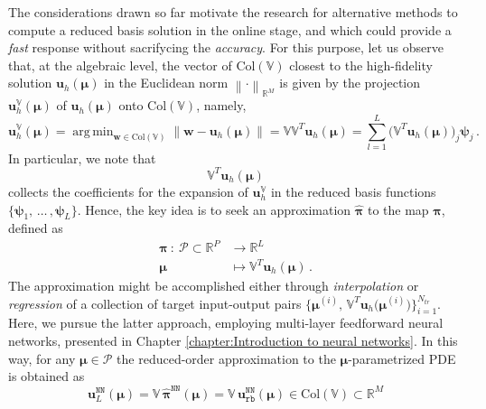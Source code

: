 \documentclass[12pt, a4paper, twoside, openright, notitlepage]{report}
\numberwithin{equation}{chapter}
\theoremstyle{theorem}
\theoremstyle{definition}
\theoremstyle{remark}
\theoremstyle{proposition}
\numberwithin{figure}{chapter}
\DeclareMathOperator*{\argmin}{arg\,min}
\newcommand{\norm}[1]{\left\lVert#1\right\rVert}
\newcommand{\bg}[1]{\boldsymbol{#1}}
\begin{document}
		The considerations drawn so far motivate the research for alternative methods to compute a reduced basis solution in the online stage, and which could provide a \emph{fast} response without sacrifycing the \emph{accuracy}. For this purpose, let us observe that, at the algebraic level, the vector of $\text{Col}(\mathbb{V})$ closest to the high-fidelity solution $\mathbf{u}_h(\bg{\mu})$ in the Euclidean norm $\norm{\cdot}_{\mathbb{R}^M}$ is given by the projection $\mathbf{u}_h^{\mathbb{V}}(\bg{\mu})$ of $\mathbf{u}_h(\bg{\mu})$ onto $\text{Col}(\mathbb{V})$, namely,
		\begin{equation*}
			\mathbf{u}_h^{\mathbb{V}}(\bg{\mu}) = \argmin_{\mathbf{w} \in \text{Col}(\mathbb{V})}{\norm{\mathbf{w} - \mathbf{u}_h(\bg{\mu})}} = \mathbb{V} \mathbb{V}^T \mathbf{u}_h(\bg{\mu}) = \sum_{l = 1}^L \big( \mathbb{V}^T \mathbf{u}_h(\bg{\mu}) \big)_j \bg{\psi}_j \, .
		\end{equation*}
		In particular, we note that
		\begin{equation*}
			\mathbb{V}^T \mathbf{u}_h(\bg{\mu})
		\end{equation*}
		collects the coefficients for the expansion of $\mathbf{u}_h^{\mathbb{V}}$ in the reduced basis functions $\big\lbrace \bg{\psi}_1, \, \ldots \, , \bg{\psi}_L \big\rbrace$. Hence, the key idea is to seek an approximation $\hat{\boldsymbol{\pi}}$ to the map $\boldsymbol{\pi}$, defined as
		\begin{equation*}
			\label{eq:interpolation-function}
			\begin{aligned}
				\boldsymbol{\pi} ~ : ~ \mathcal{P} \subset \mathbb{R}^P & \rightarrow \mathbb{R}^L \\
				\boldsymbol{\mu} ~ & \mapsto \mathbb{V}^T \mathbf{u}_h(\boldsymbol{\mu}) \, .
			\end{aligned}
		\end{equation*} 
		The approximation might be accomplished either through \emph{interpolation} \cite{Ams10, Chen17} or \emph{regression} \cite{Haa13} of a collection of target input-output pairs $\big\lbrace \boldsymbol{\mu}^{(i)}, \, \mathbb{V}^T \mathbf{u}_h \big( \boldsymbol{\mu}^{(i)}\big) \big\rbrace_{i = 1}^{N_{tr}}$. Here, we pursue the latter approach, employing multi-layer feedforward neural networks, presented in Chapter \ref{chapter:Introduction to neural networks}. In this way, for any $\bg{\mu} \in \mathcal{P}$ the reduced-order approximation to the $\bg{\mu}$-parametrized PDE is obtained as
		\begin{equation*}
			\mathbf{u}_L^{\texttt{NN}}(\bg{\mu}) = \mathbb{V} \, \hat{\bg{\pi}}^{\texttt{NN}}(\bg{\mu}) = \mathbb{V} \, \mathbf{u}_{\texttt{rb}}^{\texttt{NN}}(\bg{\mu}) \in \text{Col}(\mathbb{V}) \subset \mathbb{R}^M
		\end{equation*}
\end{document}

